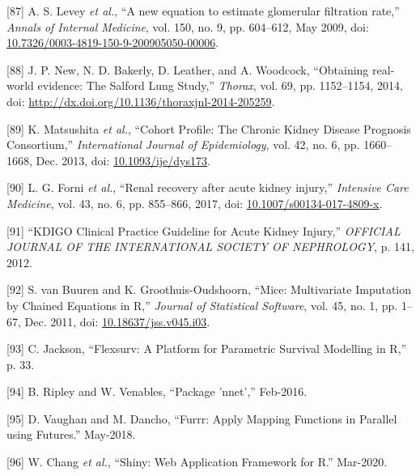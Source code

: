 \documentclass[12pt,PhD,twoside,openright]{muthesis}
\newenvironment{cslreferences}%
  {}%
  {\par}
\begin{document}
\begin{cslreferences}
\leavevmode\hypertarget{ref-levey_new_2009}{}%
{[}87{]} A. S. Levey \emph{et al.}, ``A new equation to estimate glomerular filtration rate,'' \emph{Annals of Internal Medicine}, vol. 150, no. 9, pp. 604--612, May 2009, doi: \href{https://doi.org/10.7326/0003-4819-150-9-200905050-00006}{10.7326/0003-4819-150-9-200905050-00006}.

\leavevmode\hypertarget{ref-new_obtaining_2014}{}%
{[}88{]} J. P. New, N. D. Bakerly, D. Leather, and A. Woodcock, ``Obtaining real-world evidence: The Salford Lung Study,'' \emph{Thorax}, vol. 69, pp. 1152--1154, 2014, doi: \href{https://doi.org/http://dx.doi.org/10.1136/thoraxjnl-2014-205259}{http://dx.doi.org/10.1136/thoraxjnl-2014-205259}.

\leavevmode\hypertarget{ref-matsushita_cohort_2013}{}%
{[}89{]} K. Matsushita \emph{et al.}, ``Cohort Profile: The Chronic Kidney Disease Prognosis Consortium,'' \emph{International Journal of Epidemiology}, vol. 42, no. 6, pp. 1660--1668, Dec. 2013, doi: \href{https://doi.org/10.1093/ije/dys173}{10.1093/ije/dys173}.

\leavevmode\hypertarget{ref-forni_renal_2017-1}{}%
{[}90{]} L. G. Forni \emph{et al.}, ``Renal recovery after acute kidney injury,'' \emph{Intensive Care Medicine}, vol. 43, no. 6, pp. 855--866, 2017, doi: \href{https://doi.org/10.1007/s00134-017-4809-x}{10.1007/s00134-017-4809-x}.

\leavevmode\hypertarget{ref-noauthor_kdigo_2012}{}%
{[}91{]} ``KDIGO Clinical Practice Guideline for Acute Kidney Injury,'' \emph{OFFICIAL JOURNAL OF THE INTERNATIONAL SOCIETY OF NEPHROLOGY}, p. 141, 2012.

\leavevmode\hypertarget{ref-buuren_mice_2011-1}{}%
{[}92{]} S. van Buuren and K. Groothuis-Oudshoorn, ``Mice: Multivariate Imputation by Chained Equations in R,'' \emph{Journal of Statistical Software}, vol. 45, no. 1, pp. 1--67, Dec. 2011, doi: \href{https://doi.org/10.18637/jss.v045.i03}{10.18637/jss.v045.i03}.

\leavevmode\hypertarget{ref-jackson_flexsurv_nodate}{}%
{[}93{]} C. Jackson, ``Flexsurv: A Platform for Parametric Survival Modelling in R,'' p. 33.

\leavevmode\hypertarget{ref-ripley_package_2016}{}%
{[}94{]} B. Ripley and W. Venables, ``Package 'nnet','' Feb-2016.

\leavevmode\hypertarget{ref-vaughan_furrr_2018}{}%
{[}95{]} D. Vaughan and M. Dancho, ``Furrr: Apply Mapping Functions in Parallel using Futures.'' May-2018.

\leavevmode\hypertarget{ref-chang_shiny_2020}{}%
{[}96{]} W. Chang \emph{et al.}, ``Shiny: Web Application Framework for R.'' Mar-2020.


\end{cslreferences}
\end{document}
